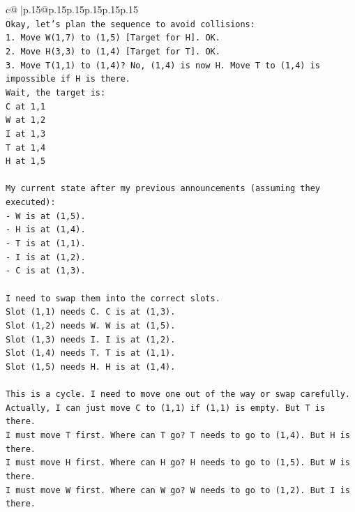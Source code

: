 \documentclass{article}
\begin{document}
{\begin{supertabular}{c@{$\;$}|p{.15\linewidth}@{}p{.15\linewidth}p{.15\linewidth}p{.15\linewidth}p{.15\linewidth}p{.15\linewidth}}
{{{\\ 
\texttt{Okay, let's plan the sequence to avoid collisions:} \\
\texttt{1. Move W(1,7) to (1,5) {[}Target for H{]}. OK.} \\
\texttt{2. Move H(3,3) to (1,4) {[}Target for T{]}. OK.} \\
\texttt{3. Move T(1,1) to (1,4)? No, (1,4) is now H. Move T to (1,4) is impossible if H is there.} \\
\texttt{Wait, the target is:} \\
\texttt{C at 1,1} \\
\texttt{W at 1,2} \\
\texttt{I at 1,3} \\
\texttt{T at 1,4} \\
\texttt{H at 1,5} \\
\\ 
\texttt{My current state after my previous announcements (assuming they executed):} \\
\texttt{{-} W is at (1,5).} \\
\texttt{{-} H is at (1,4).} \\
\texttt{{-} T is at (1,1).} \\
\texttt{{-} I is at (1,2).} \\
\texttt{{-} C is at (1,3).} \\
\\ 
\texttt{I need to swap them into the correct slots.} \\
\texttt{Slot (1,1) needs C. C is at (1,3).} \\
\texttt{Slot (1,2) needs W. W is at (1,5).} \\
\texttt{Slot (1,3) needs I. I is at (1,2).} \\
\texttt{Slot (1,4) needs T. T is at (1,1).} \\
\texttt{Slot (1,5) needs H. H is at (1,4).} \\
\\ 
\texttt{This is a cycle. I need to move one out of the way or swap carefully.} \\
\texttt{Actually, I can just move C to (1,1) if (1,1) is empty. But T is there.} \\
\texttt{I must move T first. Where can T go? T needs to go to (1,4). But H is there.} \\
\texttt{I must move H first. Where can H go? H needs to go to (1,5). But W is there.} \\
\texttt{I must move W first. Where can W go? W needs to go to (1,2). But I is there.} \\
}}}
\end{supertabular}}
\end{document}
